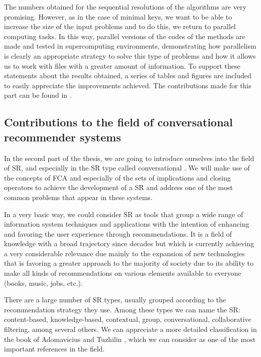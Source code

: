 The numbers obtained for the sequential resolutions of the algorithms are very promising. However, as in the case of minimal keys, we want to be able to increase the size of the input problems and to do this, we return to parallel computing tasks. In this way, parallel versions of the codes of the methods are made and tested in supercomputing environments, demonstrating how parallelism is clearly an appropriate strategy to solve this type of problems and how it allows us to work with files with a greater amount of information. To support these statements about the results obtained, a series of tables and figures are included to easily appreciate the improvements achieved. The contributions made for this part can be found in \cite{Benito-PicazoCMMSE2017}.



\subsection*{Contributions to the field of conversational recommender systems}
In the second part of the thesis, we are going to introduce ourselves into the field of SR, and especially in the SR type called conversational \cite{Griol2018,Lee2017}. We will make use of the concepts of FCA and especially of the sets of implications and closing operators to achieve the development of a SR and address one of the most common problems that appear in these systems.

In a very basic way, we could consider SR as tools that group a wide range of information system techniques and applications with the intention of enhancing and favoring the user experience through recommendations. It is a field of knowledge with a broad trajectory since decades \cite{Hill1995,Adomavicius2005} but which is currently achieving a very considerable relevance due mainly to the expansion of new technologies that is favoring a greater approach to the majority of society due to its ability to make all kinds of recommendations on various elements available to everyone (books, music, jobs, etc.).

There are a large number of SR types, usually grouped according to the recommendation strategy they use. Among these types we can name the SR: content-based, knowledge-based, contextual, group, conversational, collaborative filtering, among several others. We can appreciate a more detailed classification in the book of Adomavicius and Tuzhilin \cite{AdomaviciusBook11}, which we can consider as one of the most important references in the field.

